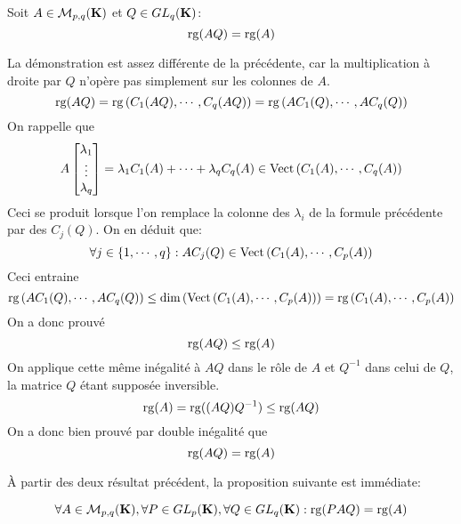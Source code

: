 \begin{prop}
 Soit $A\in\mathcal M_{p,q}(\mathbf{K})$ et $Q\in GL_{q}(\mathbf{K})$:
\begin{displaymath}
 \mathop{\mathrm{rg}}(AQ) = \mathop{\mathrm{rg}}(A)
\end{displaymath}
\end{prop}
\begin{demo}
La démonstration est assez différente de la précédente, car la multiplication à droite par $Q$ n'opère pas simplement sur les colonnes de $A$.
\begin{displaymath}
  \mathop{\mathrm{rg}}(AQ) = \mathop{\mathrm{rg}}\left( C_1(AQ),\cdots,C_q(AQ)\right) 
= \mathop{\mathrm{rg}}\left( AC_1(Q),\cdots,AC_q(Q)\right)
\end{displaymath}
On rappelle que
\begin{displaymath}
 A
\begin{bmatrix}
\lambda_1\\ \vdots \\ \lambda_q 
\end{bmatrix}
= \lambda_1 C_1(A) + \cdots + \lambda_q C_q(A)\in \mathop{\mathrm{Vect}}\left(C_1(A),\cdots,C_q(A) \right) 
\end{displaymath}
Ceci se produit lorsque l'on remplace la colonne des $\lambda_i$ de la formule précédente par des $C_j(Q)$. On en déduit que:
\begin{displaymath}
 \forall j\in\{1,\cdots,q\} : AC_j(Q) \in \mathop{\mathrm{Vect}}\left(C_1(A),\cdots,C_p(A) \right)
\end{displaymath}
Ceci entraine
\begin{displaymath}
 \mathop{\mathrm{rg}}\left( AC_1(Q),\cdots,AC_q(Q)\right) \leq \dim\left( \mathop{\mathrm{Vect}}\left(C_1(A),\cdots,C_p(A) \right)\right)
= \mathop{\mathrm{rg}} \left(C_1(A),\cdots,C_p(A) \right)
\end{displaymath}
On a donc prouvé
\begin{displaymath}
 \mathop{\mathrm{rg}}(AQ) \leq \mathop{\mathrm{rg}}(A)
\end{displaymath}
On applique cette même inégalité à $AQ$ dans le rôle de $A$ et $Q^{-1}$ dans celui de $Q$, la matrice $Q$ étant supposée inversible.
\begin{displaymath}
 \mathop{\mathrm{rg}}(A)=\mathop{\mathrm{rg}}((AQ)Q^{-1})\leq \mathop{\mathrm{rg}}(AQ)
\end{displaymath}
On a donc bien prouvé par double inégalité que
\begin{displaymath}
 \mathop{\mathrm{rg}}(AQ)=\mathop{\mathrm{rg}}(A)
\end{displaymath}
\end{demo}
\`A partir des deux résultat précédent, la proposition suivante est immédiate:
\begin{prop}
\begin{displaymath}
\forall A\in \mathcal M_{p,q}(\mathbf{K}),
\forall P \in GL_p(\mathbf{K}), \forall Q \in GL_q(\mathbf{K}) :
\mathop{\mathrm{rg}}(PAQ)=\mathop{\mathrm{rg}}(A)
\end{displaymath}
\end{prop}


